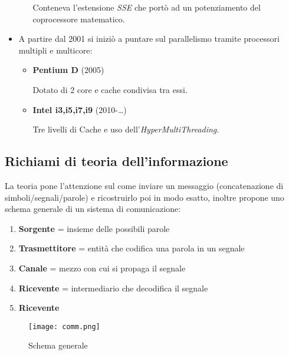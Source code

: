 \documentclass{article}
\begin{document}
\begin{itemize}
\begin{itemize}
                    Conteneva l'estensione \textit{SSE} che portò ad un potenziamento del coprocessore matematico.\newline
                
            \end{itemize}

        \item A partire dal 2001 si iniziò a puntare sul parallelismo tramite processori multipli e multicore:
        \begin{itemize}
            \item \textbf{Pentium D} (2005)

                Dotato di 2 core e cache condivisa tra essi.

            \item \textbf{Intel i3,i5,i7,i9} (2010-\ldots)

                Tre livelli di Cache e uso dell'\textit{HyperMultiThreading}.\newline
            
        \end{itemize}

\end{itemize}

\subsection{Richiami di teoria dell'informazione}

La teoria pone l'attenzione sul come inviare un messaggio (concatenazione di simboli/segnali/parole) e ricostruirlo poi in modo esatto, inoltre propone uno schema generale di un sistema di comunicazione:
\begin{enumerate}
    \item \textbf{Sorgente} = insieme delle possibili parole
    \item \textbf{Trasmettitore} = entità che codifica una parola in un segnale
    \item \textbf{Canale} = mezzo con cui si propaga il segnale
    \item \textbf{Ricevente} = intermediario che decodifica il segnale
    \item \textbf{Ricevente} 
\end{enumerate}

\begin{figure}[ht]
    \centering
    \texttt{[image: comm.png]}
    \caption{Schema generale}
    \label{fig:comm}
\end{figure}
\end{document}

